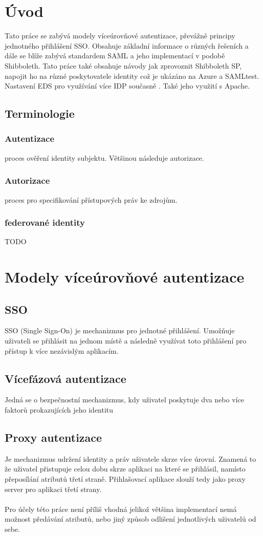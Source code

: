 \chapter{Úvod}
Tato práce se zabývá modely víceúrovňové autentizace, převážně principy jednotného přihlášení SSO. Obsahuje základní informace o různých řešeních a dále se blíže zabývá standardem SAML a jeho implementací v podobě Shibboleth. 
Tato práce také obsahuje návody jak zprovoznit Shibboleth SP, napojit ho na různé poskytovatele identity což je ukázáno na Azure a SAMLtest. Nastavení EDS pro využívání více IDP současně . Také jeho využití s Apache.
\section{Terminologie}
\subsection{Autentizace}
proces ověření identity subjektu. Většinou následuje autorizace.\cite{Authorization}
\subsection{Autorizace}
proces pro specifikování přístupových práv ke zdrojům.\cite{Autentizace}
 \subsection{federované identity}
 TODO



\chapter{Modely víceúrovňové autentizace}
\section{SSO}
\label{sso}
SSO (Single Sign-On) je mechanizmus pro jednotné přihlášení. Umožňuje uživateli se přihlásit na jednom místě a následně využívat toto přihlášení pro přístup k více nezávislým aplikacím. \cite{SSO}

\section{Vícefázová autentizace}
Jedná se o bezpečnostní mechanizmus, kdy uživatel poskytuje dva nebo více faktorů prokazujících jeho identitu \cite{wiki2FA}


\section{Proxy autentizace}
Je mechanizmus udržení identity a práv uživatele skrze více úrovní. Znamená to že uživatel přistupuje celou dobu skrze aplikaci na které se přihlásil, namísto přeposílání atributů třetí straně. Přihlašovací aplikace slouží tedy jako proxy server pro aplikaci třetí strany. \cite{ProxyA} \\ \\
Pro účely této práce není příliš vhodná jelikož většina implementací nemá možnost předávání atributů, nebo jiný způsob odlišení jednotlivých uživatelů od sebe.

